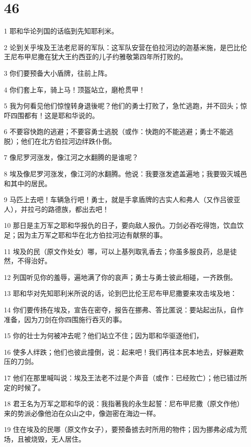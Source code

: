 \chapter{46}

\par 1 耶和华论列国的话临到先知耶利米。
\par 2 论到关乎埃及王法老尼哥的军队：这军队安营在伯拉河边的迦基米施，是巴比伦王尼布甲尼撒在犹大王约西亚的儿子约雅敬第四年所打败的。
\par 3 你们要预备大小盾牌，往前上阵。
\par 4 你们套上车，骑上马！顶盔站立，磨枪贯甲！
\par 5 我为何看见他们惊惶转身退後呢？他们的勇士打败了，急忙逃跑，并不回头；惊吓四围都有！这是耶和华说的。
\par 6 不要容快跑的逃避；不要容勇士逃脱（或作：快跑的不能逃避；勇士不能逃脱）；他们在北方伯拉河边绊跌仆倒。
\par 7 像尼罗河涨发，像江河之水翻腾的是谁呢？
\par 8 埃及像尼罗河涨发，像江河的水翻腾。他说：我要涨发遮盖遍地；我要毁灭城邑和其中的居民。
\par 9 马匹上去吧！车辆急行吧！勇士，就是手拿盾牌的古实人和弗人（又作吕彼亚人），并拉弓的路德族，都出去吧！
\par 10 那日是主万军之耶和华报仇的日子，要向敌人报仇。刀剑必吞吃得饱，饮血饮足；因为主万军之耶和华在北方伯拉河边有献祭的事。
\par 11 埃及的民（原文作处女）哪，可以上基列取乳香去；你虽多服良药，总是徒然，不得治好。
\par 12 列国听见你的羞辱，遍地满了你的哀声；勇士与勇士彼此相碰，一齐跌倒。
\par 13 耶和华对先知耶利米所说的话，论到巴比伦王尼布甲尼撒要来攻击埃及地：
\par 14 你们要传扬在埃及，宣告在密夺，报告在挪弗、答比匿说：要站起出队，自作准备，因为刀剑在你四围施行吞灭的事。
\par 15 你的壮士为何被冲去呢？他们站立不住；因为耶和华驱逐他们，
\par 16 使多人绊跌；他们也彼此撞倒，说：起来吧！我们再往本民本地去，好躲避欺压的刀剑。
\par 17 他们在那里喊叫说：埃及王法老不过是个声音（或作：已经败亡）；他已错过所定的时候了。
\par 18 君王名为万军之耶和华的说：我指著我的永生起誓：尼布甲尼撒（原文作他）来的势派必像他泊在众山之中，像迦密在海边一样。
\par 19 住在埃及的民哪（原文作女子），要预备掳去时所用的物件；因为挪弗必成为荒场，且被烧毁，无人居住。
